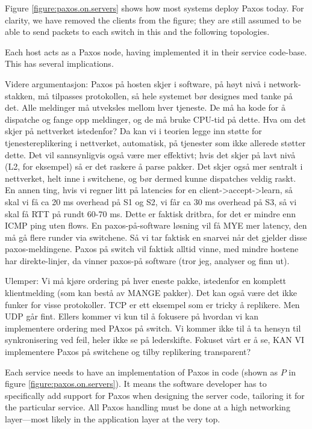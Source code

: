 Figure \vref{figure:paxos.on.servers} shows how most systems deploy Paxos
today.  For clarity, we have removed the clients from the figure; they are
still assumed to be able to send packets to each switch in this and the
following topologies.

Each host acts as a Paxos node, having implemented it in their service
code-base.  This has several implications.

Videre argumentasjon: Paxos på hosten skjer i software, på høyt nivå i
network-stakken, må tilpasses protokollen, så hele systemet bør designes med
tanke på det.  Alle meldinger må utveksles mellom hver tjeneste. De må ha
kode for å dispatche og fange opp meldinger, og de må bruke CPU-tid på
dette. Hva om det skjer på nettverket istedenfor? Da kan vi i teorien legge
inn støtte for tjenestereplikering i nettverket, automatisk, på tjenester
som ikke allerede støtter dette. Det vil sannsynligvis også være mer
effektivt; hvis det skjer på lavt nivå (L2, for eksempel) så er det raskere
å parse pakker. Det skjer også mer sentralt i nettverket, helt inne i
switchene, og bør dermed kunne dispatches veldig raskt. 
En annen ting, hvis vi regner litt på latencies for en
client->accept->learn, så skal vi få ca 20 ms overhead på S1 og S2,
vi får ca 30 ms overhead på S3, så vi skal få RTT på rundt 60-70 ms.
Dette er faktisk dritbra, for det er mindre enn ICMP ping uten flows.
En paxos-på-software løsning vil få MYE mer latency, den må gå flere
runder via switchene. Så vi tar faktisk en snarvei når det gjelder
disse paxos-meldingene. Paxos på switch vil faktisk alltid vinne, med
mindre hostene har direkte-linjer, da vinner paxos-på software (tror jeg,
analyser og finn ut).

Ulemper: Vi må kjøre
ordering på hver eneste pakke, istedenfor en komplett klientmelding (som kan
bestå av MANGE pakker). Det kan også være det ikke funker for visse
protokoller. TCP er ett eksempel som er tricky å replikere. Men UDP går
fint. Ellers kommer vi kun til å fokusere på hvordan vi kan implementere
ordering med PAxos på switch. Vi kommer ikke til å ta hensyn til
synkronisering ved feil, heler ikke se på lederskifte. Fokuset vårt er å se,
KAN VI implementere Paxos på switchene og tilby replikering transparent?

Each service needs to have an implementation of Paxos in code (shown as
$P$ in figure \ref{figure:paxos.on.servers}).  It means the software
developer has to specifically add support for Paxos when designing the
server code, tailoring it for the particular service.  All Paxos handling
must be done at a high networking layer---most
likely in the application layer at the very top.

